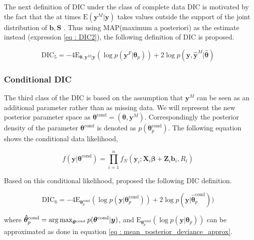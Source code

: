 The next definition of DIC under the class of complete data DIC is motivated by the fact that the at times $\text{E}(\boldsymbol{y}^M|\boldsymbol{y})$ takes values outside the support of the joint distribution of $\boldsymbol{b}, \boldsymbol{S}$ \citep{celeux_deviance_2006}. Thus using MAP(maximum a posteriori) as the estimate instead (expression \ref{eq : DIC2}), the following definition of DIC is proposed.

\begin{equation}
\label{eq : DIC5}
\text{DIC}_5 = -4\text{E}_{\boldsymbol{\theta}, \boldsymbol{y}^M|\boldsymbol{y}}(\log{p(\boldsymbol{y}^F|\boldsymbol{\theta}_p)}) + 
2\log{p(\boldsymbol{y}, \boldsymbol{\hat{y}}^M|\boldsymbol{\hat{\theta}})}
\end{equation}

\subsubsection{Conditional DIC}
The third class of the DIC is based on the assumption that $\boldsymbol{y}^M$ can be seen as an additional parameter rather than as missing data. We will represent the new posterior parameter space as $\boldsymbol{\theta}^\text{cond} = (\boldsymbol{\theta}, \boldsymbol{y}^M)$. Correspondingly the posterior density of the parameter $\boldsymbol{\theta}^\text{cond}$ is denoted as $p(\boldsymbol{\theta}^\text{cond}_p)$. The following equation shows the conditional data likelihood,

\begin{equation}
\label{eq : conditional_data_likelihood}
f(\boldsymbol{y}|\boldsymbol{\theta}^\text{cond}) = \prod_{i=1}^n f_N(\boldsymbol{y}_i; \boldsymbol{X}_i\boldsymbol{\beta} + \boldsymbol{Z}_i \boldsymbol{b}_i, R_i)
\end{equation}

Based on this conditional likelihood, \citet{celeux_deviance_2006} proposed the following DIC definition.

\begin{equation}
\label{eq : DIC6}
\text{DIC}_6 = -4\text{E}_{\boldsymbol{\theta}^\text{cond}_p} (\log{p(\boldsymbol{y}|\boldsymbol{\theta}^\text{cond}_p)}) + 2\log{p(\boldsymbol{y}|\boldsymbol{\hat{\theta}}^\text{cond}_p)})
\end{equation}

where
$\boldsymbol{\hat{\theta}}^\text{cond}_p = \operatorname*{arg\,max}_{\boldsymbol{\theta}^\text{cond}}p(\boldsymbol{\theta}^\text{cond}|\boldsymbol{y})$, and $\text{E}_{\boldsymbol{\theta}^\text{cond}_p} (\log{p(\boldsymbol{y}|\boldsymbol{\theta}_p)})$ can be approximated as done in equation \ref{eq : mean_posterior_deviance_approx}.

